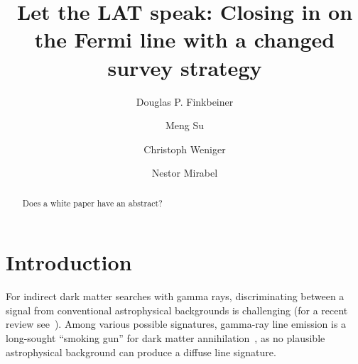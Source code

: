 \documentclass[aps,prd,superscriptaddress,showpacs,nofootinbib,fixlfloat, 12pt]{revtex4-1}
\begin{document}
\title{Let the LAT speak: Closing in on the Fermi line with a changed survey
strategy}

\author{Douglas P. Finkbeiner}

\author{Meng Su}

\author{Christoph Weniger}

\author{Nestor Mirabel}

\begin{abstract} Does a white paper have an abstract?
\end{abstract}


\maketitle



\section{Introduction}
For indirect dark matter searches with gamma rays, discriminating between a
signal from conventional astrophysical backgrounds is challenging (for a
recent review see~\cite{Bringmann:2012ez}).  Among various possible
signatures, gamma-ray line emission is a long-sought ``smoking gun'' for dark
matter annihilation~\cite{Bergstrom:1988fp}, as no plausible astrophysical
background can produce a diffuse line signature.

 
\end{document}
